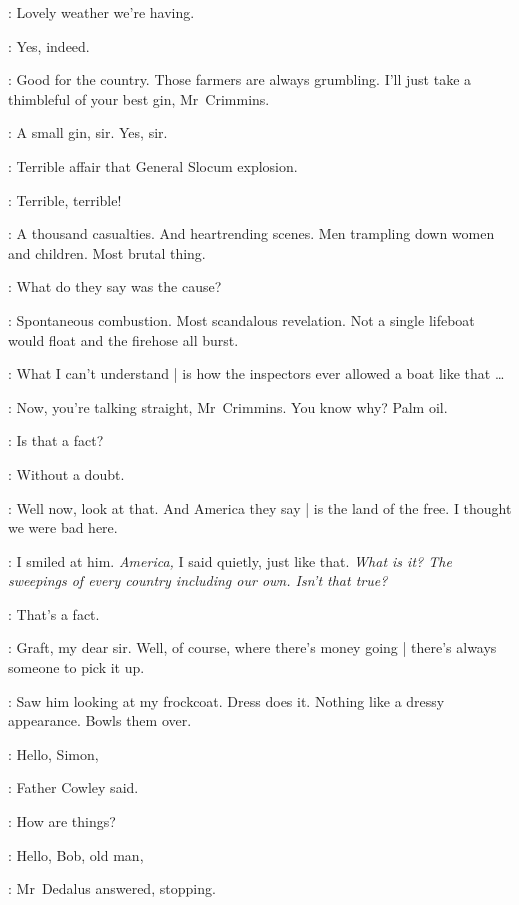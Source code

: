 :
Lovely weather we're having.

\crimmins:
Yes, indeed.

:
Good for the country.
Those farmers are always grumbling.
I'll just take a thimbleful of your best gin, Mr~Crimmins.

\crimmins:
A small gin, sir.
Yes, sir.

:
Terrible affair that General Slocum explosion.

\crimmins:
Terrible, terrible!

:
A thousand casualties.
And heartrending scenes.
Men trampling down women and children.
Most brutal thing.

\crimmins:
What do they say was the cause?

:
Spontaneous combustion.
Most scandalous revelation.
Not a single lifeboat would float and the firehose all burst.

\crimmins:
What I can't understand |
is how the inspectors
ever allowed a boat like that \ldots

:
Now, you're talking straight, Mr~Crimmins.
You know why?
Palm oil.

\crimmins:
Is that a fact?

:
Without a doubt.

\crimmins:
Well now, look at that.
And America they say |
is the land of the free.
I thought we were bad here.

:
I smiled at him.
\emph{America,}
I said quietly,
just like that.
\emph{What is it?
The sweepings of every country including our own.
Isn't that true?}

\crimmins:
That's a fact.

:
Graft,
my dear sir.
Well, of course, where there's money going |
there's always someone to pick it up.

:
Saw him looking at my frockcoat.
Dress does it.
Nothing like a dressy appearance.
Bowls them over.

\begin{interject}
    \cowley:
    Hello, Simon,

    :
    Father Cowley said.

    \cowley:
    How are things?

    \simon:
    Hello, Bob, old man,

    :
    Mr~Dedalus answered,
    stopping.
\end{interject}

